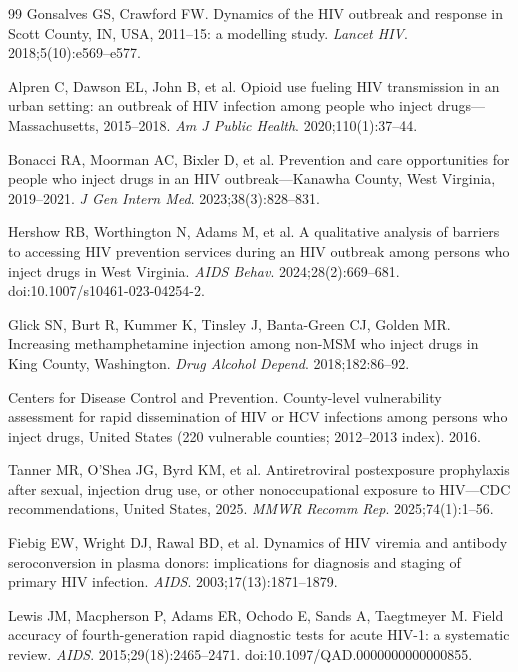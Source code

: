 \documentclass[12pt]{article}
\begin{document}
\begin{thebibliography}{99}
 Gonsalves GS, Crawford FW. Dynamics of the HIV outbreak and response in Scott County, IN, USA, 2011--15: a modelling study. \textit{Lancet HIV}. 2018;5(10):e569--e577.

 Alpren C, Dawson EL, John B, et al. Opioid use fueling HIV transmission in an urban setting: an outbreak of HIV infection among people who inject drugs---Massachusetts, 2015--2018. \textit{Am J Public Health}. 2020;110(1):37--44.

 Bonacci RA, Moorman AC, Bixler D, et al. Prevention and care opportunities for people who inject drugs in an HIV outbreak---Kanawha County, West Virginia, 2019--2021. \textit{J Gen Intern Med}. 2023;38(3):828--831.

 Hershow RB, Worthington N, Adams M, et al. A qualitative analysis of barriers to accessing HIV prevention services during an HIV outbreak among persons who inject drugs in West Virginia. \textit{AIDS Behav}. 2024;28(2):669--681. doi:10.1007/s10461-023-04254-2.

 Glick SN, Burt R, Kummer K, Tinsley J, Banta-Green CJ, Golden MR. Increasing methamphetamine injection among non-MSM who inject drugs in King County, Washington. \textit{Drug Alcohol Depend}. 2018;182:86--92.

 Centers for Disease Control and Prevention. County-level vulnerability assessment for rapid dissemination of HIV or HCV infections among persons who inject drugs, United States (220 vulnerable counties; 2012--2013 index). 2016.

 Tanner MR, O'Shea JG, Byrd KM, et al. Antiretroviral postexposure prophylaxis after sexual, injection drug use, or other nonoccupational exposure to HIV---CDC recommendations, United States, 2025. \textit{MMWR Recomm Rep}. 2025;74(1):1--56.

 Fiebig EW, Wright DJ, Rawal BD, et al. Dynamics of HIV viremia and antibody seroconversion in plasma donors: implications for diagnosis and staging of primary HIV infection. \textit{AIDS}. 2003;17(13):1871--1879.

 Lewis JM, Macpherson P, Adams ER, Ochodo E, Sands A, Taegtmeyer M. Field accuracy of fourth-generation rapid diagnostic tests for acute HIV-1: a systematic review. \textit{AIDS}. 2015;29(18):2465--2471. doi:10.1097/QAD.0000000000000855.


\end{thebibliography}
\end{document}
